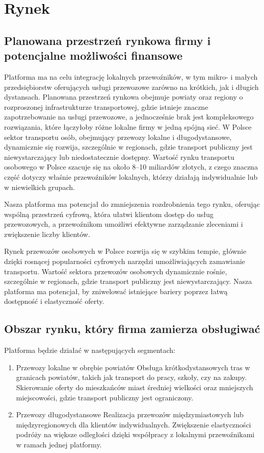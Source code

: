 \section{Rynek}
\subsection{Planowana przestrzeń rynkowa firmy i potencjalne możliwości finansowe}
Platforma ma na celu integrację lokalnych przewoźników, w tym mikro- i małych przedsiębiorstw oferujących usługi przewozowe zarówno na krótkich, jak i długich dystansach. Planowana przestrzeń rynkowa obejmuje powiaty oraz regiony o rozproszonej infrastrukturze transportowej, gdzie istnieje znaczne zapotrzebowanie na usługi przewozowe, a jednocześnie brak jest kompleksowego rozwiązania, które łączyłoby różne lokalne firmy w jedną spójną sieć.
W Polsce sektor transportu osób, obejmujący przewozy lokalne i długodystansowe, dynamicznie się rozwija, szczególnie w regionach, gdzie transport publiczny jest niewystarczający lub niedostatecznie dostępny. Wartość rynku transportu osobowego w Polsce szacuje się na około 8–10 miliardów złotych, z czego znaczna część dotyczy właśnie przewoźników lokalnych, którzy działają indywidualnie lub w niewielkich grupach.

Nasza platforma ma potencjał do zmniejszenia rozdrobnienia tego rynku, oferując wspólną przestrzeń cyfrową, która ułatwi klientom dostęp do usług przewozowych, a przewoźnikom umożliwi efektywne zarządzanie zleceniami i zwiększenie liczby klientów.

Rynek przewozów osobowych w Polsce rozwija się w szybkim tempie, głównie dzięki rosnącej popularności cyfrowych narzędzi umożliwiających zamawianie transportu. Wartość sektora przewozów osobowych dynamicznie rośnie, szczególnie w regionach, gdzie transport publiczny jest niewystarczający. Nasza platforma ma potencjał, by zniwelować istniejące bariery poprzez łatwą dostępność i elastyczność oferty.

\subsection{Obszar rynku, który firma zamierza obsługiwać}
Platforma będzie działać w następujących segmentach:
\begin{enumerate}
     
    \item Przewozy lokalne w obrębie powiatów
        Obsługa krótkodystansowych tras w granicach powiatów, takich jak transport do pracy, szkoły, czy na zakupy.
        Skierowanie oferty do mieszkańców miast średniej wielkości oraz mniejszych miejscowości, gdzie transport publiczny jest ograniczony.

    \item Przewozy długodystansowe
        Realizacja przewozów międzymiastowych lub międzyregionowych dla klientów indywidualnych.
        Zwiększenie elastyczności podróży na większe odległości dzięki współpracy z lokalnymi przewoźnikami w ramach jednej platformy.
 
\end{enumerate}      

